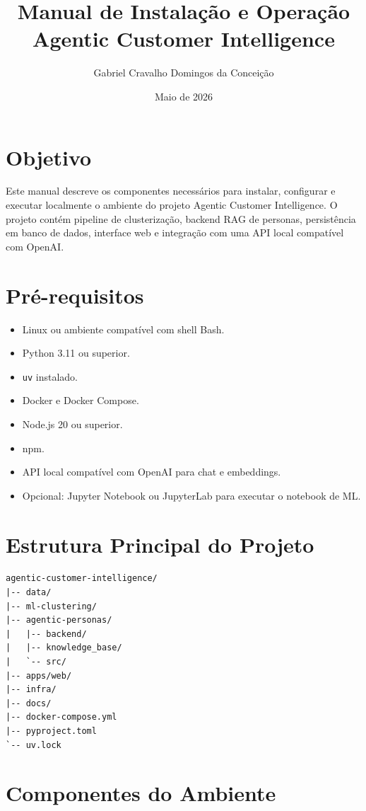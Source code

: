 \documentclass[12pt,a4paper]{article}
\title{\textbf{Manual de Instalação e Operação}\\Agentic Customer Intelligence}
\author{Gabriel Cravalho Domingos da Conceição}
\date{Maio de 2026}
\begin{document}
\maketitle

\section{Objetivo}

Este manual descreve os componentes necessários para instalar, configurar e executar localmente o ambiente do projeto Agentic Customer Intelligence. O projeto contém pipeline de clusterização, backend RAG de personas, persistência em banco de dados, interface web e integração com uma API local compatível com OpenAI.

\section{Pré-requisitos}

\begin{itemize}
  \item Linux ou ambiente compatível com shell Bash.
  \item Python 3.11 ou superior.
  \item \texttt{uv} instalado.
  \item Docker e Docker Compose.
  \item Node.js 20 ou superior.
  \item npm.
  \item API local compatível com OpenAI para chat e embeddings.
  \item Opcional: Jupyter Notebook ou JupyterLab para executar o notebook de ML.
\end{itemize}

\section{Estrutura Principal do Projeto}

\begin{verbatim}
agentic-customer-intelligence/
|-- data/
|-- ml-clustering/
|-- agentic-personas/
|   |-- backend/
|   |-- knowledge_base/
|   `-- src/
|-- apps/web/
|-- infra/
|-- docs/
|-- docker-compose.yml
|-- pyproject.toml
`-- uv.lock
\end{verbatim}

\section{Componentes do Ambiente}
\end{document}
